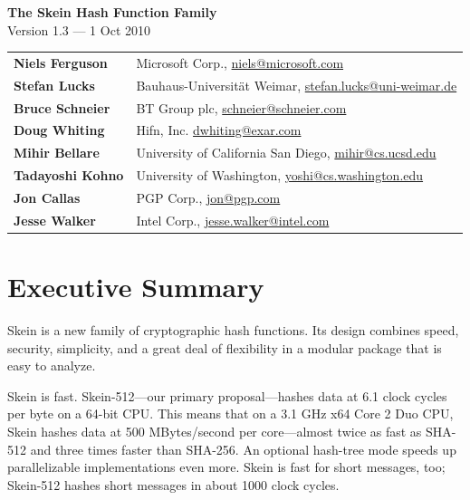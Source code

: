\documentclass[11pt,twoside]{article}
\newcommand{\purl}{\protect\url}
\let\mycleardoublepage=\cleardoublepage
\def\cleardoublepage{\clearpage\pagestyle{empty}\mycleardoublepage\pagestyle{plain}}
\begin{document}
\thispagestyle{empty}
\begin{center}
{\Large\bf The Skein Hash Function Family} \\[15pt]
{\small Version 1.3 --- 1 Oct 2010}
\end{center}

\vspace*{.5in}

\begin{center}
\begin{tabular}{ll}
    \bf{Niels Ferguson} & {Microsoft Corp., \purl{niels@microsoft.com}} \\
    \bf{Stefan Lucks} & {Bauhaus-Universit\"at Weimar, \purl{stefan.lucks@uni-weimar.de}}  \\
    \bf{Bruce Schneier} & {BT Group plc, \purl{schneier@schneier.com}}  \\
    \bf{Doug Whiting} & {Hifn, Inc. \purl{dwhiting@exar.com}}  \\
    \bf{Mihir Bellare} & {University of California San Diego, \purl{mihir@cs.ucsd.edu}}  \\
    \bf{Tadayoshi Kohno} & {University of Washington, \purl{yoshi@cs.washington.edu}}  \\
    \bf{Jon Callas} & {PGP Corp., \purl{jon@pgp.com}} \\
    \bf{Jesse Walker} & {Intel Corp., \purl{jesse.walker@intel.com}}
\end{tabular}
\end{center}
\date{}

\cleardoublepage

\setcounter{page}{1}

\section*{Executive Summary}

Skein is a new family of cryptographic hash functions.  Its design combines speed, security, simplicity, and a great deal of flexibility in a modular package that is easy to analyze.

Skein is fast.  Skein-512---our primary proposal---hashes data at 6.1 clock cycles per byte on a 64-bit CPU.  This means that on a 3.1 GHz x64 Core 2 Duo CPU, Skein hashes data at 500 MBytes/second per core---almost twice as fast as SHA-512 and three times faster than SHA-256.  An optional hash-tree mode speeds up parallelizable implementations even more.  Skein is fast for short messages, too; Skein-512 hashes short messages in about 1000 clock cycles.
\end{document}
